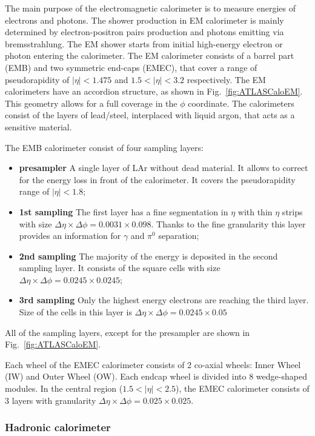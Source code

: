 The main purpose of the electromagnetic calorimeter is to measure energies of electrons and photons. The shower production in EM calorimeter is mainly determined by electron-positron pairs production and photons emitting via bremsstrahlung. The EM shower starts from initial high-energy electron or photon entering the calorimeter. The EM calorimeter consists of a barrel part (EMB) and two symmetric end-caps (EMEC), that cover a range of pseudorapidity of $|\eta|<1.475$ and $1.5 < |\eta|<3.2$ respectively. The EM calorimeters have an accordion structure, as shown in Fig.~\ref{fig:ATLASCaloEM}. This geometry allows for a full coverage in the $\phi$ coordinate.
The calorimeters consist of the layers of lead/steel, interplaced with liquid argon, that acts as a sensitive material.

The EMB calorimeter consist of four sampling layers:
\begin{itemize}
\item \textbf{presampler} A single layer of LAr without dead material. It allows to correct for the energy loss in front of the calorimeter. It covers the pseudorapidity range of $|\eta|<1.8$;
\item \textbf{1st sampling} The first layer has a fine segmentation in $\eta$ with thin $\eta$ strips with size $\Delta \eta \times \Delta \phi = 0.0031 \times 0.098$. Thanks to the fine granularity this layer provides an information for $\gamma$ and $\pi^0$ separation;
\item \textbf{2nd sampling} The majority of the energy is deposited in the second sampling layer. It consists of the square cells with size $\Delta \eta \times \Delta \phi = 0.0245 \times 0.0245$;
\item \textbf{3rd sampling} Only the highest energy electrons are reaching the third layer. Size of the cells in this layer is $\Delta \eta \times \Delta \phi = 0.0245 \times 0.05$
\end{itemize}
All of the sampling layers, except for the presampler are shown in Fig.~\ref{fig:ATLASCaloEM}.

Each wheel of the EMEC calorimeter consists of 2 co-axial wheels: Inner Wheel (IW) and Outer Wheel (OW). Each endcap wheel is divided into 8 wedge-shaped modules. In the central region ($1.5<|\eta|<2.5$), the EMEC calorimeter consists of 3 layers with granularity $\Delta \eta \times \Delta \phi = 0.025 \times 0.025$. 

\subsubsection{Hadronic calorimeter}

